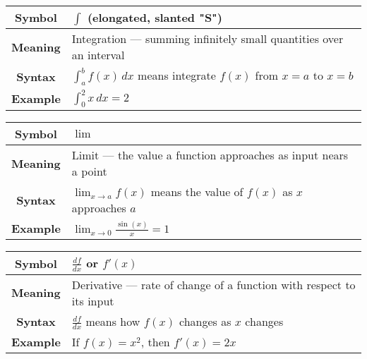 \begin{NxLightBox}[title={Integral Notation}]
    \begingroup
    \renewcommand{\arraystretch}{1.8}
    \begin{tabularx}{\linewidth}{|c|X|}
        \hline
        \textbf{Symbol} & \( \int \) (elongated, slanted "S") \\
        \hline
        \textbf{Meaning} & Integration — summing infinitely small quantities over an interval \\
        \hline
        \textbf{Syntax} & \( \int_a^b f(x)\,dx \) means integrate \( f(x) \) from \( x = a \) to \( x = b \) \\
        \hline
        \textbf{Example} & \( \int_0^2 x\,dx = 2 \) \\
        \hline
    \end{tabularx}
    \endgroup
\end{NxLightBox}

\begin{NxLightBox}[title={Limit Notation}]
    \begingroup
    \renewcommand{\arraystretch}{1.8}
    \begin{tabularx}{\linewidth}{|c|X|}
        \hline
        \textbf{Symbol} & \( \lim \) \\
        \hline
        \textbf{Meaning} & Limit — the value a function approaches as input nears a point \\
        \hline
        \textbf{Syntax} & \( \lim_{x \to a} f(x) \) means the value of \( f(x) \) as \( x \) approaches \( a \) \\
        \hline
        \textbf{Example} & \( \lim_{x \to 0} \frac{\sin(x)}{x} = 1 \) \\
        \hline
    \end{tabularx}
    \endgroup
\end{NxLightBox}

\begin{NxLightBox}[title={Derivative Notation}]
    \begingroup
    \renewcommand{\arraystretch}{1.8}
    \begin{tabularx}{\linewidth}{|c|X|}
        \hline
        \textbf{Symbol} & \( \frac{df}{dx} \) or \( f'(x) \) \\
        \hline
        \textbf{Meaning} & Derivative — rate of change of a function with respect to its input \\
        \hline
        \textbf{Syntax} & \( \frac{df}{dx} \) means how \( f(x) \) changes as \( x \) changes \\
        \hline
        \textbf{Example} & If \( f(x) = x^2 \), then \( f'(x) = 2x \) \\
        \hline
    \end{tabularx}
    \endgroup
\end{NxLightBox}

